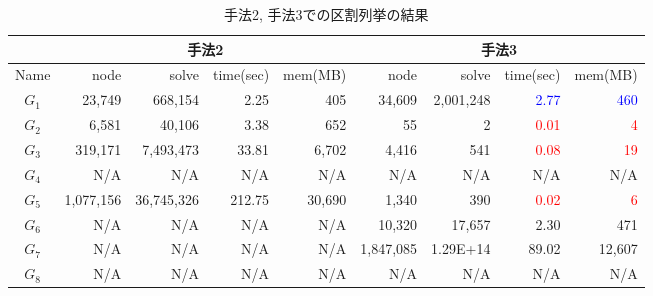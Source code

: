 \documentclass[a4paper,landscape]{jsarticle}
\begin{document}
\begin{table}[htbp]
  \small
  \centering
  \caption*{手法2, 手法3での区割列挙の結果}
  \label{table:result_r}
  \begin{tabular}{|c||rrrr||rrrr|}
    \hline
    & \multicolumn{4}{c||}{手法2} & \multicolumn{4}{c|}{手法3}\\
    \hline
    Name & node & solve & time(sec) & mem(MB) & node & solve & time(sec) & mem(MB) \\
    \hline \hline
    $G_1$ & 23{,}749 & 668{,}154 & 2.25 & 405 & 34{,}609 & 2{,}001{,}248 & \textcolor{blue}{2.77} & \textcolor{blue}{460}\\
    $G_2$ & 6{,}581 & 40{,}106 & 3.38 & 652 & 55 & 2 & \textcolor{red}{0.01} & \textcolor{red}{4}\\
    $G_3$ & 319{,}171 & 7{,}493{,}473 & 33.81 & 6{,}702 & 4{,}416 & 541 & \textcolor{red}{0.08} & \textcolor{red}{19}\\
    $G_4$ & \cellcolor{lightgray} N/A & \cellcolor{lightgray} N/A & \cellcolor{lightgray} N/A & \cellcolor{lightgray} N/A & \cellcolor{lightgray} N/A & \cellcolor{lightgray} N/A & \cellcolor{lightgray} N/A & \cellcolor{lightgray} N/A \\
    $G_5$ & 1{,}077{,}156 & 36{,}745{,}326 & 212.75 & 30{,}690 & 1{,}340 & 390 & \textcolor{red}{0.02} & \textcolor{red}{6}\\
    $G_6$ & \cellcolor{lightgray} N/A & \cellcolor{lightgray} N/A & \cellcolor{lightgray} N/A & \cellcolor{lightgray} N/A & \cellcolor{pink}10{,}320 & \cellcolor{pink}17{,}657 & \cellcolor{pink}2.30 & \cellcolor{pink}471\\
    $G_7$ & \cellcolor{lightgray} N/A & \cellcolor{lightgray} N/A & \cellcolor{lightgray} N/A & \cellcolor{lightgray} N/A & \cellcolor{pink}1{,}847{,}085 & \cellcolor{pink}1.29E+14 & \cellcolor{pink}89.02 & \cellcolor{pink}12{,}607\\
    $G_8$ & \cellcolor{lightgray} N/A & \cellcolor{lightgray} N/A & \cellcolor{lightgray} N/A & \cellcolor{lightgray} N/A & \cellcolor{lightgray} N/A & \cellcolor{lightgray} N/A & \cellcolor{lightgray} N/A & \cellcolor{lightgray} N/A \\
    \hline
  \end{tabular}
\end{table}
\end{document}
